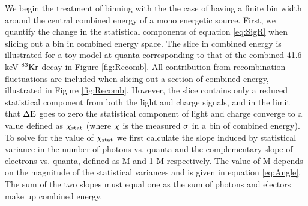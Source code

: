 We begin the treatment of binning with the the case of having a finite bin width around the central combined energy of a mono energetic source. First, we quantify the change in the statistical components of equation \ref{eq:SigR} when slicing out a bin in combined energy space. The slice in combined energy is illustrated for a toy model at quanta corresponding to that of the combined 41.6 keV $\rm^{83}Kr$ decay in Figure \ref{fig:Recomb}. All contribution from recombination fluctuations are included when slicing out a section of combined energy, illustrated in Figure \ref{fig:Recomb}. However, the slice contains only a reduced statistical component from both the light and charge signals, and in the limit that $\rm \Delta E$ goes to zero the statistical component of light and charge converge to a value defined as $\rm \chi_{stat}$ (where $\rm \chi$ is the measured $\rm \sigma$ in a bin of combined energy). To solve for the value of  $\rm \chi_{stat}$ we first calculate the slope induced by statistical variance in the number of photons vs. quanta and the complementary slope of electrons vs. quanta, defined as M and 1-M respectively.  The value of M depends on the magnitude of the statistical variances and is given in equation \ref{eq:Angle}. The sum of the two slopes must equal one as the sum of photons and electors make up combined energy.


